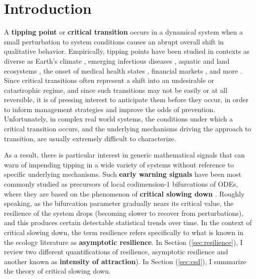 
\section{Introduction}
\label{sec:intro}

A \textbf{tipping point} or \textbf{critical transition} occurs in a dynamical system when a small perturbation to system conditions causes an abrupt overall shift in qualitative behavior. 
%
Empirically, tipping points have been studied in contexts as diverse as 
Earth's climate \cite{lentonTippingElementsEarth2008, dakosSlowingEarlyWarning2008a}, 
emerging infectious diseases \cite{brettDynamicalFootprintsEnable2020}, 
aquatic and land ecosystems \cite{schefferCatastrophicShiftsEcosystems2001a, carpenterRisingVarianceLeading2006}, 
the onset of medical health states \cite{mcsharryPredictionEpilepticSeizures2003, venegasSelforganizedPatchinessAsthma2005}, 
financial markets \cite{gatfaouiFlickeringInformationSpreading2019},
and more \cite{georgeEarlyWarningSignals2021, schefferEarlywarningSignalsCritical2009a, boettigerEarlyWarningSignals2013}. 
%
Since critical transitions often represent a shift into an undesirable or catastrophic regime, and since such transitions may not be easily or at all reversible, %
it is of pressing interest to anticipate them before they occur, in order to inform management strategies and improve the odds of prevention. Unfortunately, in complex real world systems, the conditions under which a critical transition occurs, and the underlying mechanisms driving the approach to transition, are usually extremely difficult to characterize.

As a result, there is particular interest in generic mathematical signals that can warn of impending tipping in a wide variety of systems without reference to specific underlying mechanisms. Such \textbf{early warning signals} have been most commonly studied as precursors of local codimension-1 bifurcations of ODEs, where they are based on the phenomenon of \textbf{critical slowing down} \cite{schefferEarlywarningSignalsCritical2009a}. Roughly speaking, as the bifurcation parameter gradually nears its critical value, the resilience of the system drops (becoming slower to recover from perturbations), and this produces certain detectable statistical trends over time. In the context of critical slowing down, the term resilience refers specifically to what is known in the ecology literature as \textbf{asymptotic resilience}. In Section (\ref{sec:resilience}), I review two different quantifications of resilience, asymptotic resilience and another known as \textbf{intensity of attraction}). In Section (\ref{sec:csd}), I summarize the theory of critical slowing down. 

